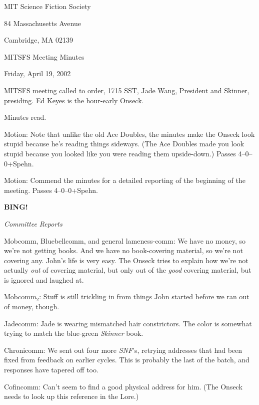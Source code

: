 \documentclass[12pt]{article}
\newcommand{\bing}{{\bf BING!} }
\newcommand{\goto}[1]{\bing \vskip 12pt \centerline{{\em{#1}}}}
\begin{document}
\begin{center}

MIT Science Fiction Society 

84 Massachusetts Avenue

Cambridge, MA 02139

\vspace{12pt}

MITSFS Meeting Minutes 

Friday, April 19, 2002

\end{center}
 
\vspace{18pt}

\setlength{\parskip}{6pt}

\noindent
MITSFS meeting called to order, 1715 SST, Jade Wang, President and
Skinner, presiding.  Ed Keyes is the hour-early Onseck.

Minutes read.

Motion: Note that unlike the old Ace Doubles, the minutes make the
Onseck look stupid because he's reading things sideways.  (The Ace
Doubles made you look stupid because you looked like you were reading
them upside-down.)  Passes 4--0--0+Spehn.

Motion: Commend the minutes for a detailed reporting of the
beginning of the meeting.  Passes 4--0--0+Spehn.

\goto{Committee Reports}

Mobcomm, Bluebellcomm, and general lameness-comm: We have no money,
so we're not getting books.  And we have no book-covering material,
so we're not covering any.  John's life is very easy.  The Onseck
tries to explain how we're not actually {\em out} of covering
material, but only out of the {\em good} covering material, but is
ignored and laughed at.

Mobcomm$_2$: Stuff is still trickling in from things John started
before we ran out of money, though.

Jadecomm: Jade is wearing mismatched hair constrictors.  The color
is somewhat trying to match the blue-green {\em Skinner} book.

Chronicomm: We sent out four more {\em SNF}'s, retrying addresses that
had been fixed from feedback on earlier cycles.  This is probably
the last of the batch, and responses have tapered off too.

Cofincomm: Can't seem to find a good physical address for him.  (The
Onseck needs to look up this reference in the Lore.)
\end{document}
